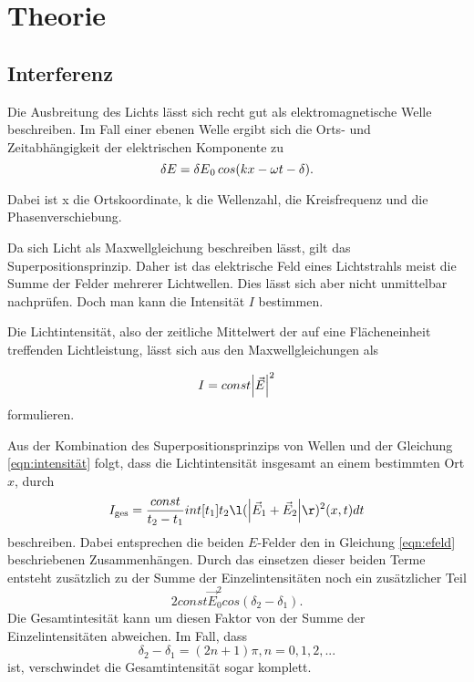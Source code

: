 \section{Theorie}
\label{sec:Theorie}

\subsection{Interferenz}

Die Ausbreitung des Lichts lässt sich recht gut als elektromagnetische Welle beschreiben. Im Fall einer ebenen Welle ergibt sich die Orts- und Zeitabhängigkeit der elektrischen Komponente zu 
\begin{equation}
    \var{E}= \var{E}_0 cos(kx - \omega t - \delta).
    \label{eqn:efeld}
\end{equation}

Dabei ist x die Ortskoordinate, k die Wellenzahl, \omega die Kreisfrequenz und \delta die Phasenverschiebung. 

Da sich Licht als Maxwellgleichung beschreiben lässt, gilt das Superpositionsprinzip. Daher ist das elektrische Feld eines Lichtstrahls meist die Summe der Felder mehrerer Lichtwellen.
Dies lässt sich aber nicht unmittelbar nachprüfen. 
Doch man kann die Intensität $I$ bestimmen. 

Die Lichtintensität, also der zeitliche Mittelwert der auf eine Flächeneinheit treffenden Lichtleistung, lässt sich aus den Maxwellgleichungen als 

\begin{equation}
    I = const \abs{\vec{E}}^{2}
    \label{eqn:intensität}
\end{equation} 
formulieren. 

Aus der Kombination des Superpositionsprinzips von Wellen und der Gleichung \ref{eqn:intensität} folgt, dass die Lichtintensität insgesamt an einem bestimmten Ort $x$, durch 
\begin{equation}
    I_\text{ges}= \frac{const}{t_2-t_1} int[t_1]{t_2} \l(\abs{\vec{E}_1 + \vec{E}_2} \r)^2 (x, t) dt
    \label{eqn:iges}
\end{equation}
beschreiben. Dabei entsprechen die beiden $E$-Felder den in Gleichung \ref{eqn:efeld} beschriebenen Zusammenhängen. 
Durch das einsetzen dieser beiden Terme entsteht zusätzlich zu der Summe der Einzelintensitäten noch ein zusätzlicher Teil 
\begin{equation}
    2 const \vec{E}_{0}^2 cos(\delta_2 - \delta_1).
    \label{eqn:zusatz}
\end{equation}
Die Gesamtintesität kann um diesen Faktor von der Summe der Einzelintensitäten abweichen. Im Fall, dass 
\begin{equation}
    \delta_2 - \delta_1 = (2n +1) \pi , n= 0, 1, 2, ...
\end{equation}
ist, verschwindet die Gesamtintensität sogar komplett. 

